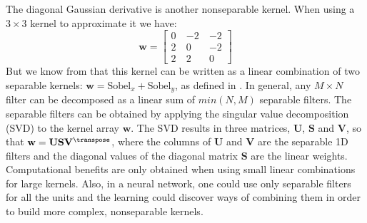 The diagonal Gaussian derivative is another nonseparable kernel. When using a $3 \times 3$ kernel to approximate it we have:
\begin{equation}
    \mathbf{w} =
    \begin{bmatrix}
        0 ~ & -2 ~ & -2 \\
        2 ~ & 0 ~  & -2 \\
        2~  & 2 ~  & 0
    \end{bmatrix}
\end{equation}
But we know from \chap{\ref{chapter:image_derivatives}} that this kernel can be written as a linear combination of two separable kernels: $\mathbf{w} = \text{Sobel}_x + \text{Sobel}_y$, as defined in \eqn{\ref{eq:sobel_kernels}}. In general, any $M \times N$ filter can be decomposed as a linear sum of $min(N,M)$ separable filters. The separable filters can be obtained by applying the singular value decomposition (SVD) to the kernel array $\mathbf{w}$. The SVD results in three matrices, $\mathbf{U}$, $\mathbf{S}$ and $\mathbf{V}$, so that $\mathbf{w} = \mathbf{U} \mathbf{S} \mathbf{V}^\transpose$, where the columns of $\mathbf{U}$ and $\mathbf{V}$ are the separable 1D filters and the diagonal values of the diagonal matrix $\mathbf{S}$ are the linear weights. Computational benefits are only obtained when using small linear combinations for large kernels. Also, in a neural network, one could use only separable filters for all the units and the learning could discover ways of combining them in order to build more complex, nonseparable kernels.



